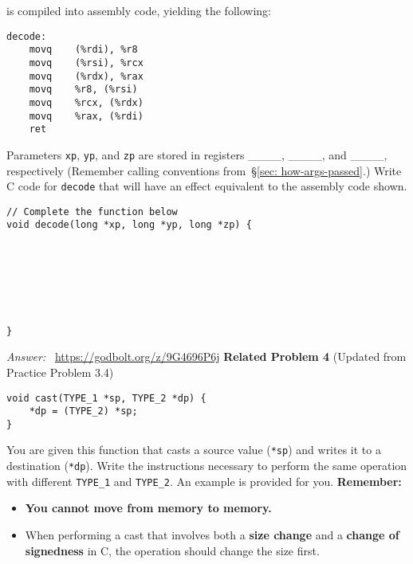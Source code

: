 is compiled into assembly code, yielding the following:
%
\begin{lstlisting}[basicstyle=\ttfamily, frame=none]
decode:
    movq    (%rdi), %r8
    movq    (%rsi), %rcx
    movq    (%rdx), %rax
    movq    %r8, (%rsi)
    movq    %rcx, (%rdx)
    movq    %rax, (%rdi)
    ret
\end{lstlisting}
%
\vspace{5pt}
%
Parameters \texttt{xp}, \texttt{yp}, and \texttt{zp} are stored in registers 
\_\_\_\_, \_\_\_\_, and \_\_\_\_, respectively (Remember calling conventions 
from~\S\ref{sec: how-args-passed}.)
%
\vspace{5pt}
%
Write C code for \texttt{decode} that will have an effect equivalent to the 
assembly code shown.\\
\begin{lstlisting}[basicstyle=\ttfamily, frame=none]
// Complete the function below
void decode(long *xp, long *yp, long *zp) {







}
\end{lstlisting}
\textit{Answer: }~\url{https://godbolt.org/z/9G4696P6j} 
%
\clearpage
%
\noindent\textbf{Related Problem 4} (Updated from Practice Problem 3.4)
%
\begin{lstlisting}
void cast(TYPE_1 *sp, TYPE_2 *dp) {
    *dp = (TYPE_2) *sp;
}
\end{lstlisting}
%
You are given this function that casts a source value (\texttt{*sp}) and writes it 
to a destination (\texttt{*dp}). Write the instructions necessary to perform the same 
operation with different \texttt{TYPE\_1} and \texttt{TYPE\_2}. An example is provided for you.
%
\textbf{Remember:}
\begin{itemize}
    \item \textbf{You cannot move from memory to memory.}
    \item When performing a cast that involves both a \textbf{size change} and a 
    \textbf{change of signedness} in C, the operation should change the size first.
\end{itemize}
%
\vspace{10pt}
%
